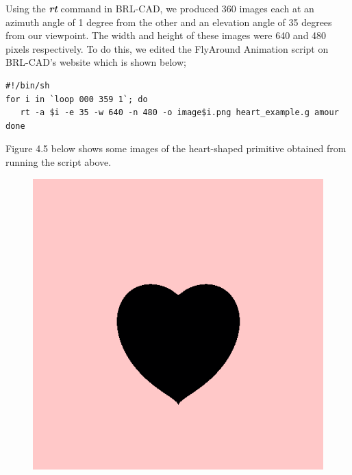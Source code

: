 \hspace{30} Using the \textit{\textbf{rt}} command in BRL-­CAD, we produced 360 images each at an  
azimuth angle of 1 degree from the other and an elevation angle of 35 degrees from our viewpoint.
The width and height   of   these   images   were   640   and   480  
pixels   respectively. To   do   this,   we   edited   the   Fly­Around   Animation   script   \cite{42}  
on BRL­-CAD's website which is shown below;
\begin{verbatim}
#!/bin/sh 
for i in `loop 000 359 1`; do 
   rt -­a $i ­-e 35 -­w 640 -­n 480 -­o image$i.png heart_example.g amour 
done \end{verbatim}
Figure 4.5 below shows some images of the heart­-shaped primitive obtained from running the script above.

\begin{figure}[htbp]
\centering
\includegraphics[trim=0.0cm 0.5cm 0.1cm 0.1cm, clip=true, totalheight=0.5\textheight]{Pictures/Besides.png}
\begin{minipage}{0.2\textheight}
\begin{flushleft}

\end{flushleft}
\end{minipage}
\end{figure}
